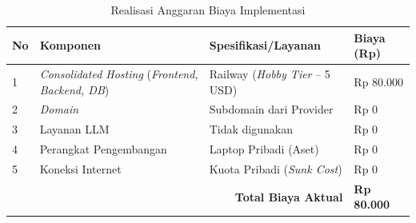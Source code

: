 \begin{table}[H]
    \centering
    \caption{Realisasi Anggaran Biaya Implementasi}
    \label{tbl:realisasi_rab}
    \begin{tabular}{|p{}|p{}|p{}|p{}|}
        \hline
        \textbf{No} & \textbf{Komponen} & \textbf{Spesifikasi/Layanan} & \textbf{Biaya (Rp)} \\
        \hline
        1 & \textit{Consolidated Hosting} (\textit{Frontend, Backend, DB}) & Railway (\textit{Hobby Tier} -- 5 USD) & Rp 80.000 \\
        \hline
        2 & \textit{Domain} & Subdomain dari Provider & Rp 0 \\
        \hline
        3 & Layanan LLM & Tidak digunakan & Rp 0 \\
        \hline
        4 & Perangkat Pengembangan & Laptop Pribadi (Aset) & Rp 0 \\
        \hline
        5 & Koneksi Internet & Kuota Pribadi (\textit{Sunk Cost}) & Rp 0 \\
        \hline
        \multicolumn{3}{|r|}{\textbf{Total Biaya Aktual}} & \textbf{Rp 80.000} \\
        \hline
    \end{tabular}
\end{table}
